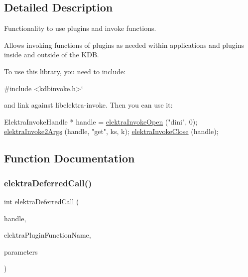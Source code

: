 \subsection{Detailed Description}
Functionality to use plugins and invoke functions. 

Allows invoking functions of plugins as needed within applications and plugins inside and outside of the K\+DB.

To use this library, you need to include\+:


\begin{DoxyCode}
\textcolor{preprocessor}{#include <kdbinvoke.h>}`
\end{DoxyCode}


and link against {\ttfamily libelektra-\/invoke}. Then you can use it\+:


\begin{DoxyCode}
ElektraInvokeHandle * handle = \hyperlink{group__invoke_ga3eb20131e9a8fc9a6cebf126927c09bc}{elektraInvokeOpen} (\textcolor{stringliteral}{"dini"}, 0);
\hyperlink{group__invoke_gaa257d93399c60f73c611205bbfa7c9a0}{elektraInvoke2Args} (handle, \textcolor{stringliteral}{"get"}, ks, k);
\hyperlink{group__invoke_ga684a21daa0b3c20783c55184a9157b3b}{elektraInvokeClose} (handle);
\end{DoxyCode}
 

\subsection{Function Documentation}
\mbox{\label{group__invoke_ga80328407d9d418af04c54ab5f10a63c0}} 
\subsubsection{\texorpdfstring{elektra\+Deferred\+Call()}{elektraDeferredCall()}}
{\footnotesize\ttfamily int elektra\+Deferred\+Call (\begin{DoxyParamCaption}\item[{Plugin $\ast$}]{handle,  }\item[{const char $\ast$}]{elektra\+Plugin\+Function\+Name,  }\item[{Key\+Set $\ast$}]{parameters }\end{DoxyParamCaption})}



